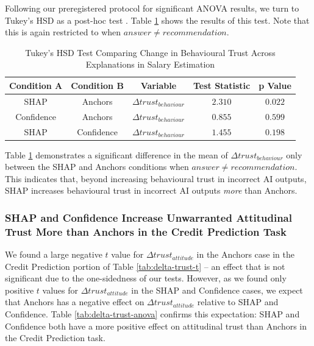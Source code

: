 Following our preregistered protocol for significant ANOVA results, we turn to Tukey's HSD as a post-hoc test \cite{natarajan_binns_2022}. Table \ref{tab:delta-trust-hsd} shows the results of this test. Note that this is again restricted to when $answer \neq recommendation$.

\begin{table}[htbp]
    \caption{Tukey's HSD Test Comparing Change in Behavioural Trust Across Explanations in Salary Estimation}
    \begin{center}
    \begin{tabular}{ccccc}
        \toprule
        Condition A & Condition B & Variable & Test Statistic & p Value \\
        \midrule
        SHAP & Anchors & $\Delta trust_{behaviour}$ & $\mathbf{2.310}$ & $\mathbf{0.022}$ \\
        Confidence & Anchors & $\Delta trust_{behaviour}$ & $0.855$ & $0.599$ \\
        SHAP & Confidence & $\Delta trust_{behaviour}$ & $1.455$ & $0.198$ \\
        \bottomrule
    \end{tabular}
    \label{tab:delta-trust-hsd}
    \end{center}
\end{table}

Table \ref{tab:delta-trust-hsd} demonstrates a significant difference in the mean of $\Delta trust_{behaviour}$ only between the SHAP and Anchors conditions when $answer \neq recommendation$. This indicates that, beyond increasing behavioural trust in incorrect AI outputs, SHAP increases behavioural trust in incorrect AI outputs \emph{more} than Anchors.

\subsubsection{SHAP and Confidence Increase Unwarranted Attitudinal Trust More than Anchors in the Credit Prediction Task}\label{ssec:hsd-credit}
We found a large negative $t$ value for $\Delta trust_{attitude}$ in the Anchors case in the Credit Prediction portion of Table \ref{tab:delta-trust-t} -- an effect that is not significant due to the one-sidedness of our tests. However, as we found only positive $t$ values for $\Delta trust_{attitude}$ in the SHAP and Confidence cases, we expect that Anchors has a negative effect on $\Delta trust_{attitude}$ relative to SHAP and Confidence. Table \ref{tab:delta-trust-anova} confirms this expectation: SHAP and Confidence both have a more positive effect on attitudinal trust than Anchors in the Credit Prediction task.

